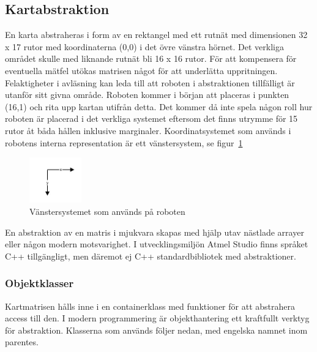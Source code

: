 \documentclass[a4paper,12pt,fleqn]{article}
\begin{document}
\subsection{Kartabstraktion}


En karta abstraheras i form av en rektangel med ett rutnät med dimensionen 32 x 17 rutor med koordinaterna (0,0) i det övre vänstra hörnet. Det verkliga området skulle med liknande rutnät bli 16 x 16 rutor. För att kompensera för eventuella mätfel utökas matrisen något för att underlätta uppritningen. Felaktigheter i avläsning kan leda till att roboten i abstraktionen tillfälligt är utanför sitt givna område. Roboten kommer i början att placeras i punkten (16,1) och rita upp kartan utifrån detta. Det kommer då inte spela någon roll hur roboten är placerad i det verkliga systemet eftersom det finns utrymme för 15 rutor åt båda hållen inklusive marginaler. Koordinatsystemet som används i robotens interna representation är ett vänstersystem, se figur~\ref{fig:coor}

\begin{figure}[htp] %
  \begin{center}
  \includegraphics[keepaspectratio=true,width=0.2\textwidth]{coor.jpg}  %
  \end{center}
  \caption{Vänstersystemet som används på roboten} %
  \label{fig:coor}
\end{figure}

En abstraktion av en matris i mjukvara skapas med hjälp utav nästlade arrayer eller någon modern motsvarighet. I utvecklingsmiljön Atmel Studio finns språket C++ tillgängligt, men däremot ej C++ standardbibliotek med abstraktioner.

\subsubsection{Objektklasser}

Kartmatrisen hålls inne i en containerklass med funktioner för att abstrahera access till den. I modern programmering är objekthantering ett kraftfullt verktyg för abstraktion. Klasserna som används följer nedan, med engelska namnet inom parentes.
\end{document}
